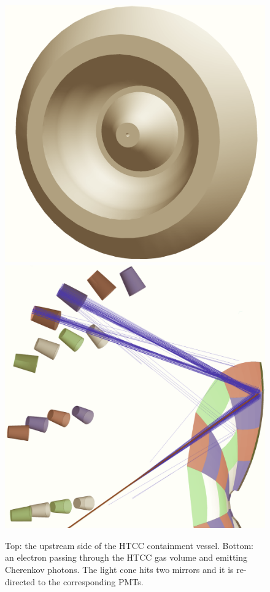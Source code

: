 \begin{figure}
	\centering
	\includegraphics[width=0.99\columnwidth,keepaspectratio]{img/htccGeometry.png}
	\includegraphics[width=0.99\columnwidth,keepaspectratio]{img/htccDetail.png}
	\caption{Top: the upstream side of the HTCC containment vessel. Bottom: an electron passing through the HTCC gas
          volume and emitting Cherenkov photons. The light cone hits two mirrors and it is re-directed to the corresponding
          PMTs.}
	\label{fig:htccGeometry}
\end{figure}

